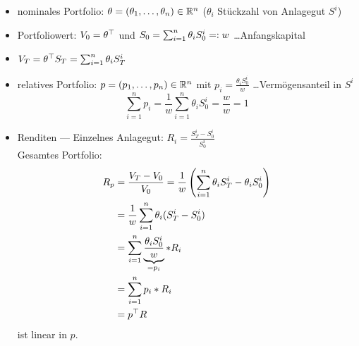\begin{*bemerkung}
	\begin{itemize}
		\item nominales Portfolio: $\theta = (\theta_1, \dots, \theta_n) \in \mathbb{R}^n$ ($\theta_i$ Stückzahl von Anlagegut $S^i$)
		\item Portfoliowert: $V_0 = \theta^{\top}$ und $S_0 = \sum_{i=1}^n \theta_i S_0^i \mathrel{=:} w$ \dots Anfangskapital
		\item[]
		$V_T = \theta^{\top} S_T = \sum_{i=1}^n \theta_i S_T^i$
		
		\item relatives Portfolio: $p = (p_1, \dots, p_n) \in \mathbb{R}^n$ mit $p_i = \frac{\theta_i S_0^i}{w}$ \dots Vermögensanteil in $S^i$
		\begin{equation*}
			\sum_{i=1}^n p_i = \frac{1}{w} \sum_{i=1}^n \theta_i S_0^i = \frac{w}{w} = 1
		\end{equation*}
		
		\item Renditen --- Einzelnes Anlagegut: $R_i = \frac{S_T^i - S_0^i}{S_0^i}$ \\
		Gesamtes Portfolio: 
		\begin{equation*}
			\begin{aligned}
				R_p &= \frac{V_T - V_0}{V_0} = \frac{1}{w} \left( \sum_{i=1}^n \theta_i S_T^i - \theta_i S_0^i \right) \\
				&= \frac{1}{w} \sum_{i=1}^n \theta_i (S_T^i - S_0^i) \\
				&= \sum_{i=1}^n \underbrace{\frac{\theta_i S_0^i}{w}}_{= p_i} * R_i \\
				&= \sum_{i=1}^n p_i * R_i \\
				&= p^{\top} R
			\end{aligned}
		\end{equation*} 
		ist linear in $p$.
	\end{itemize}
\end{*bemerkung}